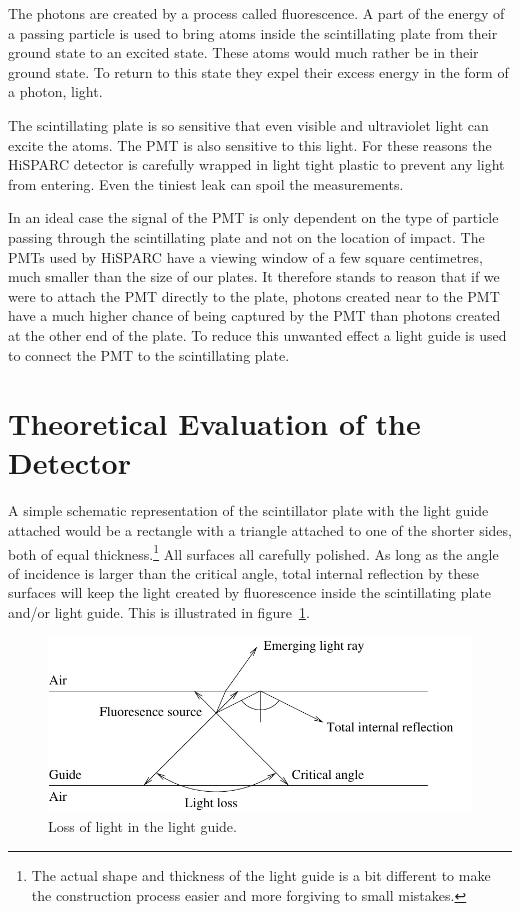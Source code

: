 \documentclass[12pt,a4paper]{article}
\numberwithin{equation}{section}
\numberwithin{figure}{section}
\numberwithin{table}{section}
\begin{document}
The photons are created by a process called fluorescence. A part of the energy of a passing particle is used to bring atoms inside the scintillating plate from their ground state to an excited state. These atoms would much rather be in their ground state. To return to this state they expel their excess energy in the form of a photon, light.

The scintillating plate is so sensitive that even visible and ultraviolet light can excite the atoms. The PMT is also sensitive to this light. For these reasons the HiSPARC detector is carefully wrapped in light tight plastic to prevent any light from entering. Even the tiniest leak can spoil the measurements.

In an ideal case the signal of the PMT is only dependent on the type of particle passing through the scintillating plate and not on the location of impact. The PMTs used by HiSPARC have a viewing window of a few square centimetres, much smaller than the size of our plates. It therefore stands to reason that if we were to attach the PMT directly to the plate, photons created near to the PMT have a much higher chance of being captured by the PMT than photons created at the other end of the plate. To reduce this unwanted effect a light guide is used to connect the PMT to the scintillating plate.

\section{Theoretical Evaluation of the Detector}
A simple schematic representation of the scintillator plate with the light guide attached would be a rectangle with a triangle attached to one of the shorter sides, both of equal thickness.\footnote{The actual shape and thickness of the light guide is a bit different to make the construction process easier and more forgiving to small mistakes.} All surfaces all carefully polished. As long as the angle of incidence is larger than the critical angle, total internal reflection by these surfaces will keep the light created by fluorescence inside the scintillating plate and/or light guide. This is illustrated in figure~\ref{fig:light_loss}.

\begin{figure}\begin{center}
\includegraphics[scale=1]{light_loss.pdf}%
\caption{Loss of light in the light guide.}\label{fig:light_loss}
\end{center}\end{figure}
\end{document}
